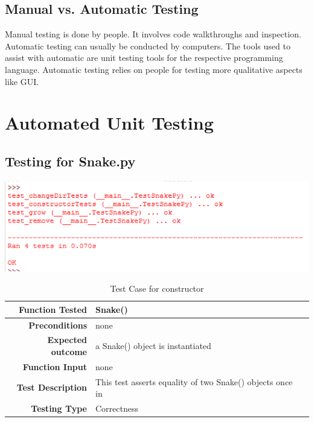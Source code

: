 \documentclass[12pt]{article}
\begin{document}
\subsection{Manual vs. Automatic Testing}
Manual testing is done by people. It involves code walkthroughs and inspection. \newline\newline
Automatic testing can usually be conducted by computers. The tools used to assist with automatic are unit testing tools for the respective programming language. Automatic testing relies on people for testing more qualitative aspects like GUI. 


\section{Automated Unit Testing}
\subsection{Testing for Snake.py}
\includegraphics{testSnakeResults}\newline\newline
\begin{center}
	\begin{longtable}{ | r | p{4cm} | p{10cm} }
	\caption{Test Case for constructor} \\ \hline \label{TblInputVar} 
	\textbf{Function Tested} & Snake()\\ \hline
	\textbf{Preconditions} & none \\ \hline
	\textbf{Expected outcome} & a Snake() object is instantiated \\ \hline
	\textbf{Function Input} & none \\ \hline
	\textbf{Test Description} & This test asserts equality of two Snake() objects once in\\ \hline
	\textbf{Testing Type} & Correctness\\ \hline
	
	\end{longtable}
\end{center}
\end{document}
